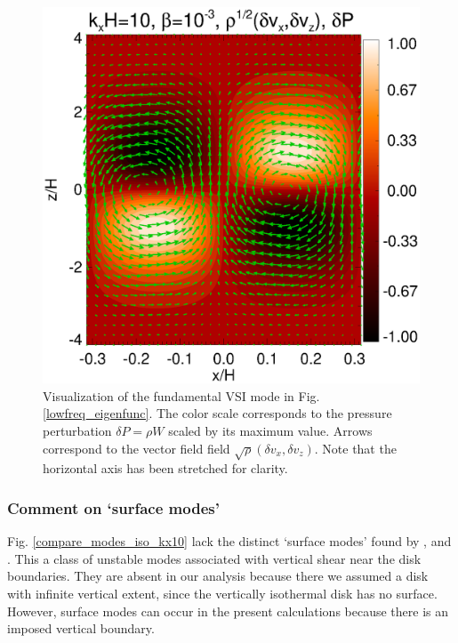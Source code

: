 \begin{figure}
  \includegraphics[width=\linewidth]{figures/result2d_iso}
  \caption{Visualization of the fundamental VSI mode in
    Fig. \ref{lowfreq_eigenfunc}. The color scale corresponds to the
    pressure perturbation $\delta P=\rho W$ scaled by its maximum value.
    Arrows correspond to the vector field field $\sqrt{\rho}(\delta
    v_x,\delta v_z)$. Note that the horizontal axis has been stretched 
    for clarity.  
    \label{lowfreq_eigenfunc_2d}
  }
\end{figure}

\subsubsection{Comment on `surface modes'}\label{surf_comment} 
Fig. \ref{compare_modes_iso_kx10} lack the distinct `surface modes' found by 
,   and . 
This a class of unstable modes associated with vertical shear near the
disk boundaries. They are absent in our  
analysis because there we assumed a disk with infinite 
vertical extent, since the vertically isothermal disk has no
surface. However, surface modes can occur in the present calculations 
because there is an imposed vertical boundary.   

